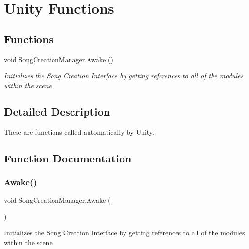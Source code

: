 \hypertarget{group___s_c_m_unity}{}\section{Unity Functions}
\label{group___s_c_m_unity}
\subsection*{Functions}
\begin{DoxyCompactItemize}
\item 
void \hyperlink{group___s_c_m_unity_ga2747d8e56d35acf19b90525b861cc7dd}{Song\+Creation\+Manager.\+Awake} ()
\begin{DoxyCompactList}\small\item\em Initializes the \hyperlink{group___doc_s_c}{Song Creation Interface} by getting references to all of the modules within the scene. \end{DoxyCompactList}\end{DoxyCompactItemize}


\subsection{Detailed Description}
These are functions called automatically by Unity. 

\subsection{Function Documentation}
\mbox{\label{group___s_c_m_unity_ga2747d8e56d35acf19b90525b861cc7dd}} 
\subsubsection{\texorpdfstring{Awake()}{Awake()}}
{\footnotesize\ttfamily void Song\+Creation\+Manager.\+Awake (\begin{DoxyParamCaption}{ }\end{DoxyParamCaption})\hspace{0.3cm}{\ttfamily [private]}}



Initializes the \hyperlink{group___doc_s_c}{Song Creation Interface} by getting references to all of the modules within the scene. 



